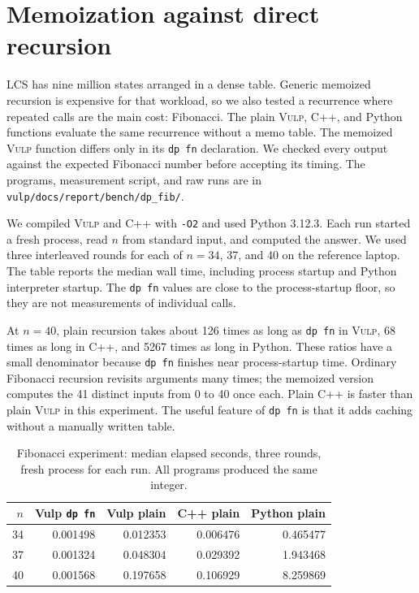 \documentclass[12pt,a4paper]{report}
\newcommand{\vulp}{\textsc{Vulp}}
\begin{document}
\section{Memoization against direct recursion}
LCS has nine million states arranged in a dense table. Generic memoized recursion is expensive for that workload, so we also tested a recurrence where repeated calls are the main cost: Fibonacci. The plain \vulp{}, C++, and Python functions evaluate the same recurrence without a memo table. The memoized \vulp{} function differs only in its \texttt{dp fn} declaration. We checked every output against the expected Fibonacci number before accepting its timing. The programs, measurement script, and raw runs are in \texttt{vulp/docs/report/bench/dp\_fib/}.

We compiled \vulp{} and C++ with \texttt{-O2} and used Python 3.12.3. Each run started a fresh process, read $n$ from standard input, and computed the answer. We used three interleaved rounds for each of $n=34$, 37, and 40 on the reference laptop. The table reports the median wall time, including process startup and Python interpreter startup. The \texttt{dp fn} values are close to the process-startup floor, so they are not measurements of individual calls.

\noindent\begin{minipage}{\linewidth}
At $n=40$, plain recursion takes about 126 times as long as \texttt{dp fn} in \vulp{}, 68 times as long in C++, and 5267 times as long in Python. These ratios have a small denominator because \texttt{dp fn} finishes near process-startup time. Ordinary Fibonacci recursion revisits arguments many times; the memoized version computes the 41 distinct inputs from 0 to 40 once each. Plain C++ is faster than plain \vulp{} in this experiment. The useful feature of \texttt{dp fn} is that it adds caching without a manually written table.
\end{minipage}

\begin{table}[htbp]
\centering\small
\begin{tabular}{|r|r|r|r|r|}
\hline
$n$ & Vulp \texttt{dp fn} & Vulp plain & C++ plain & Python plain\\\hline
34 & 0.001498 & 0.012353 & 0.006476 & 0.465477\\\hline
37 & 0.001324 & 0.048304 & 0.029392 & 1.943468\\\hline
40 & 0.001568 & 0.197658 & 0.106929 & 8.259869\\\hline
\end{tabular}
\caption{Fibonacci experiment: median elapsed seconds, three rounds, fresh process for each run. All programs produced the same integer.}
\label{tab:fib}
\end{table}
\end{document}
